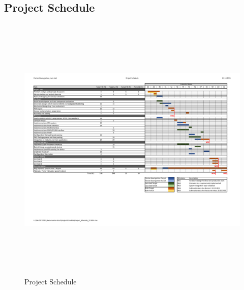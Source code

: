 \begin{landscape}
    \section{Project Schedule}
    \begin{figure}[h!]
    	\includegraphics[height=13cm, trim=17mm 69mm 25mm 20mm, clip]{appendix/Project_Schedule_211001}
    	\bigskip
    	\caption{Project Schedule}
	    \vspace{-2cm}
	    \label{fig:project_schedule}
    \end{figure}
    \pagebreak

\end{landscape}